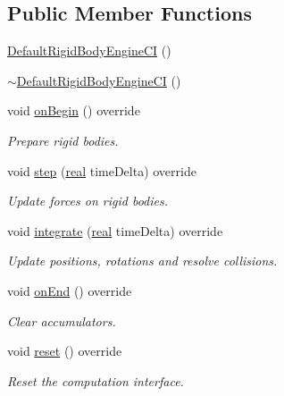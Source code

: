 \subsection*{Public Member Functions}
\begin{DoxyCompactItemize}
\item 
\mbox{\hyperlink{classr3_1_1_default_rigid_body_engine_c_i_a277f7da049340a3957fdaf8cb7ee0dfe}{Default\+Rigid\+Body\+Engine\+CI}} ()
\item 
\mbox{\hyperlink{classr3_1_1_default_rigid_body_engine_c_i_af68e19bbae7b792bf57d24a4004295eb}{$\sim$\+Default\+Rigid\+Body\+Engine\+CI}} ()
\item 
void \mbox{\hyperlink{classr3_1_1_default_rigid_body_engine_c_i_a5d9e40ea40845499f01081d21cd9ff64}{on\+Begin}} () override
\begin{DoxyCompactList}\small\item\em Prepare rigid bodies. \end{DoxyCompactList}\item 
void \mbox{\hyperlink{classr3_1_1_default_rigid_body_engine_c_i_ac45ae1d1889c75e6839b865870cbf59c}{step}} (\mbox{\hyperlink{namespacer3_ab2016b3e3f743fb735afce242f0dc1eb}{real}} time\+Delta) override
\begin{DoxyCompactList}\small\item\em Update forces on rigid bodies. \end{DoxyCompactList}\item 
void \mbox{\hyperlink{classr3_1_1_default_rigid_body_engine_c_i_a4b79e7e4bc76eedcad7ef5c4777b9d33}{integrate}} (\mbox{\hyperlink{namespacer3_ab2016b3e3f743fb735afce242f0dc1eb}{real}} time\+Delta) override
\begin{DoxyCompactList}\small\item\em Update positions, rotations and resolve collisions. \end{DoxyCompactList}\item 
void \mbox{\hyperlink{classr3_1_1_default_rigid_body_engine_c_i_ad7746126ebd5aab4cfc352dd9facabb2}{on\+End}} () override
\begin{DoxyCompactList}\small\item\em Clear accumulators. \end{DoxyCompactList}\item 
void \mbox{\hyperlink{classr3_1_1_default_rigid_body_engine_c_i_a06bd27e94b26017e7960e01f6e884e33}{reset}} () override
\begin{DoxyCompactList}\small\item\em Reset the computation interface. \end{DoxyCompactList}\end{DoxyCompactItemize}
